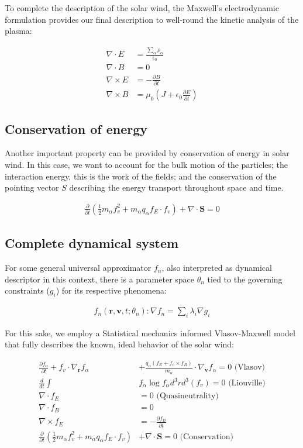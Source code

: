 \documentclass[12pt]{article}
\begin{document}
To complete the description of the solar wind, the Maxwell's electrodynamic formulation provides our final description to well-round the kinetic analysis of the plasma:

\begin{align*}
    \nabla \cdot E &= \frac{\sum_{\alpha} \rho_\alpha}{\epsilon_0} \\
    \nabla \cdot B &= 0 \\
    \nabla \times E &= - \frac{\partial B}{\partial t} \\
    \nabla \times B &= \mu_0 \left(J + \epsilon_0 \frac{\partial E}{\partial t}\right)
\end{align*}

\subsection{Conservation of energy}
Another important property can be provided by conservation of energy in solar wind. In this case, we want to account for the bulk motion of the particles; the interaction energy, this is the work of the fields; and the conservation of the pointing vector $S$ describing the energy transport throughout space and time.

\begin{align*}
    \frac{\partial}{\partial t} \left( \frac{1}{2} m_\alpha f_v^2 + m_\alpha q_\alpha f_E \cdot f_v\right) + \nabla \cdot \textbf{S} = 0
\end{align*}

\subsection{Complete dynamical system}
For some general universal approximator $f_n$, also interpreted as dynamical descriptor in this context, there is a parameter space $\theta_n$ tied to the governing constraints ($g_i$) for its respective phenomena:

\begin{align*}
    f_n(\mathbf{r}, \mathbf{v}, t; \theta_n): \nabla f_n = \sum_{i} \lambda_i \nabla g_i
\end{align*}

For this sake, we employ a Statistical mechanics informed Vlasov-Maxwell model that fully describes the known, ideal behavior of the solar wind:

\begin{align*}
    \frac{\partial f_\alpha}{\partial t} + f_v \cdot \nabla_{\mathbf{r}} f_\alpha &+ \frac{q_\alpha ( f_E + f_v \times f_B)}{m_\alpha} \cdot \nabla_{\mathbf{v}} f_\alpha = 0 \text{ (Vlasov)}\\
\frac{d}{dt} \int &f_\alpha \log f_\alpha d^3r d^3(f_v) = 0 \text{ (Liouville)}\\
\nabla \cdot f_E &= 0 \text{ (Quasineutrality)}\\
\nabla \cdot f_B &= 0 \\
\nabla \times f_E &= - \frac{\partial f_B}{\partial t} \\
\frac{\partial}{\partial t} \left( \frac{1}{2} m_\alpha f_v^2 + m_\alpha q_\alpha f_E \cdot f_v \right) &+ \nabla \cdot \textbf{S} = 0 \text{ (Conservation)} \\
\end{align*}
\end{document}
